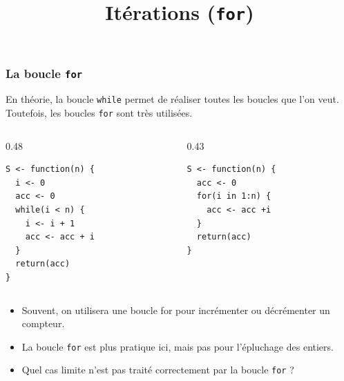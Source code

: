 \documentclass[10pt]{beamer}
\title{Itérations (\texttt{for})}
\begin{document}
\maketitle





\begin{frame}[fragile]
  \frametitle{La boucle \texttt{for}}

  En théorie, la boucle \texttt{while} permet de réaliser toutes les boucles que l'on veut.
  Toutefois, les boucles \texttt{for} sont très utilisées.


\begin{columns}[t]
\begin{column}{0.48\textwidth}
  \begin{lstlisting}[style=editor]
S <- function(n) {
  i <- 0
  acc <- 0
  while(i < n) {
    i <- i + 1
    acc <- acc + i
  }
  return(acc)
}
\end{lstlisting}
\end{column}
\begin{column}{0.43\textwidth}
\begin{lstlisting}[style=editor]
S <- function(n) {
  acc <- 0
  for(i in 1:n) {
    acc <- acc +i
  }
  return(acc)
}
\end{lstlisting}
\end{column}
\end{columns}

\begin{itemize}
\item Souvent, on utilisera une boucle for pour incrémenter ou décrémenter un compteur.
\item La boucle \texttt{for} est plus pratique ici, mais pas pour l'épluchage des entiers.
\item Quel cas limite n'est pas traité correctement par la boucle \texttt{for} ?

\end{itemize}
\end{frame}
\end{document}
